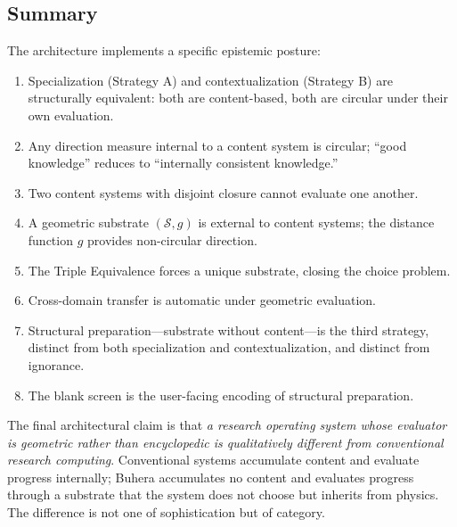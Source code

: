 \documentclass[11pt,twocolumn,a4paper]{article}
\begin{document}
\subsection{Summary}

The architecture implements a specific epistemic posture:

\begin{enumerate}[leftmargin=*]
\item Specialization (Strategy A) and contextualization (Strategy B) are structurally equivalent: both are content-based, both are circular under their own evaluation.
\item Any direction measure internal to a content system is circular; ``good knowledge'' reduces to ``internally consistent knowledge.''
\item Two content systems with disjoint closure cannot evaluate one another.
\item A geometric substrate $(\mathcal{S}, g)$ is external to content systems; the distance function $g$ provides non-circular direction.
\item The Triple Equivalence forces a unique substrate, closing the choice problem.
\item Cross-domain transfer is automatic under geometric evaluation.
\item Structural preparation---substrate without content---is the third strategy, distinct from both specialization and contextualization, and distinct from ignorance.
\item The blank screen is the user-facing encoding of structural preparation.
\end{enumerate}

The final architectural claim is that \emph{a research operating system whose evaluator is geometric rather than encyclopedic is qualitatively different from conventional research computing}. Conventional systems accumulate content and evaluate progress internally; Buhera accumulates no content and evaluates progress through a substrate that the system does not choose but inherits from physics. The difference is not one of sophistication but of category.
\end{document}
